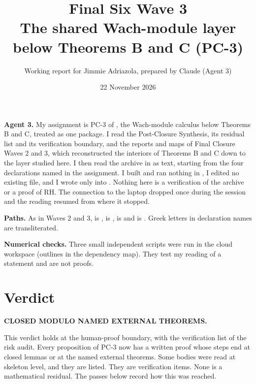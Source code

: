 \documentclass[11pt]{article}
\title{Final Six Wave 3\\ The shared Wach-module layer below Theorems B and C (PC-3)}
\author{Working report for Jimmie Adriazola, prepared by Claude (Agent 3)}
\date{22 November 2026}
\theoremstyle{definition}
\theoremstyle{remark}
\begin{document}
\maketitle

\noindent\textbf{Agent 3.} My assignment is PC-3 of , the Wach-module calculus below Theorems B and C, treated as one package. I read the Post-Closure Synthesis, its residual list and its verification boundary, and the reports and maps of Final Closure Waves 2 and 3, which reconstructed the interiors of Theorems B and C down to the layer studied here. I then read the archive in  as text, starting from the four declarations named in the assignment. I built and ran nothing in , I edited no existing file, and I wrote only into . Nothing here is a verification of the archive or a proof of RH. The connection to the laptop dropped once during the session and the reading resumed from where it stopped.

\medskip\noindent\textbf{Paths.} As in Waves 2 and 3,  is ,  is ,  is  and  is . Greek letters in declaration names are transliterated.

\medskip\noindent\textbf{Numerical checks.} Three small independent scripts were run in the cloud workspace (outlines in the dependency map). They test my reading of a statement and are not proofs.

\section{Verdict}

\textbf{CLOSED MODULO NAMED EXTERNAL THEOREMS.}

This verdict holds at the human-proof boundary, with the verification list of the risk audit. Every proposition of PC-3 now has a written proof whose steps end at closed lemmas or at the named external theorems. Some bodies were read at skeleton level, and they are listed. They are verification items. None is a mathematical residual. The passes below record how this was reached.
\end{document}
